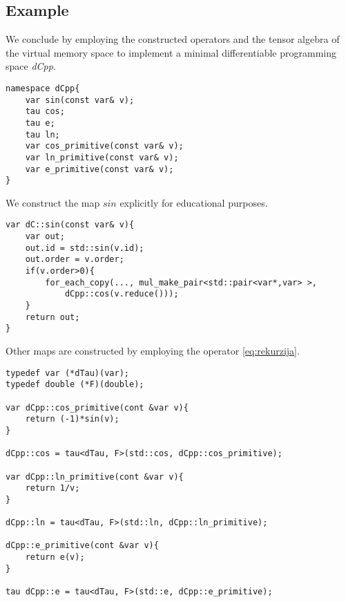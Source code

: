 \subsection{Example}

We conclude by employing the constructed operators and the tensor algebra of the virtual memory space to implement a minimal differentiable programming space \emph{dCpp}.

\begin{lstlisting}
namespace dCpp{
    var sin(const var& v);
    tau cos;
    tau e;
    tau ln;
    var cos_primitive(const var& v);
    var ln_primitive(const var& v);
    var e_primitive(const var& v);
}
\end{lstlisting}

We construct the map $sin$ explicitly for educational purposes.

\begin{lstlisting}
var dC::sin(const var& v){
    var out;
    out.id = std::sin(v.id);
    out.order = v.order;
    if(v.order>0){
    	for_each_copy(..., mul_make_pair<std::pair<var*,var> >,
    		dCpp::cos(v.reduce()));
    }
    return out;
}
\end{lstlisting}
Other maps are constructed by employing the operator \eqref{eq:rekurzija}.
\begin{lstlisting}
typedef var (*dTau)(var);
typedef double (*F)(double);

var dCpp::cos_primitive(cont &var v){
    return (-1)*sin(v);
}

dCpp::cos = tau<dTau, F>(std::cos, dCpp::cos_primitive);

var dCpp::ln_primitive(cont &var v){
    return 1/v;
}

dCpp::ln = tau<dTau, F>(std::ln, dCpp::ln_primitive);

dCpp::e_primitive(cont &var v){
    return e(v);
}

tau dCpp::e = tau<dTau, F>(std::e, dCpp::e_primitive);

\end{lstlisting}
